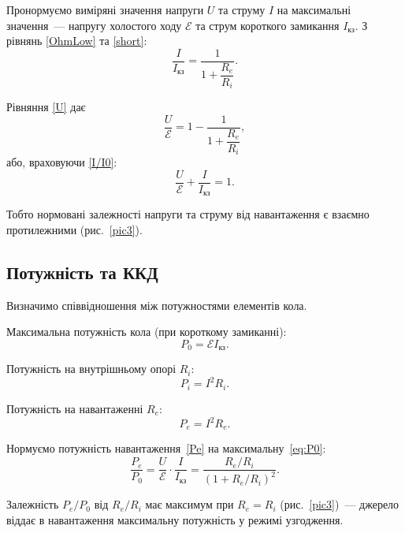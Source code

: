 \documentclass{LabWork}
\begin{document}
Пронормуємо виміряні значення напруги $U$ та струму $I$ на максимальні значення~--- напругу холостого ходу $\mathcal{E}$ та струм короткого замикання $I_\text{кз}$. З рівнянь \eqref{OhmLow} та \eqref{short}:
\begin{equation}\label{I/I0}
	\frac{I}{I_\text{кз}} = \frac{1}{1 + \dfrac{R_e}{R_i}}.
\end{equation}

Рівняння \eqref{U} дає
\begin{equation}\label{Г/Г0}
	\frac{U}{\mathcal{E}} = 1 - \frac{1}{1 + \dfrac{R_e}{R_i}},
\end{equation}
або, враховуючи \eqref{I/I0}:
\begin{equation}
	\frac{U}{\mathcal{E}} + \frac{I}{I_\text{кз}}  = 1.
\end{equation}

Тобто нормовані залежності напруги та струму від навантаження є взаємно протилежними (рис.~\ref{pic3}).

\subsection{Потужність та ККД}

Визначимо співвідношення між потужностями елементів кола.

Максимальна потужність кола (при короткому замиканні):
\begin{equation}\label{eq:P0}
    P_0 = \mathcal{E} I_\text{кз}.
\end{equation}

Потужність на внутрішньому опорі $R_i$:
\begin{equation}\label{Pi}
	P_i = I^2R_i.
\end{equation}

Потужність на навантаженні $R_e$:
\begin{equation}\label{Pe}
	P_e = I^2R_e.
\end{equation}

Нормуємо потужність навантаження~\eqref{Pe} на максимальну~\eqref{eq:P0}:
\begin{equation}\label{Pe/P0}
	\frac{P_e}{P_0} = \frac{U}{\mathcal{E}} \cdot \frac{I}{I_\text{кз}} = \frac{R_e/R_i}{\left( 1+ R_e/R_i \right)^2 }.
\end{equation}

Залежність $P_e/P_0$ від $R_e/R_i$ має максимум при $R_e=R_i$ (рис.~\ref{pic3})~--- джерело віддає в навантаження максимальну потужність у режимі узгодження.
\end{document}
